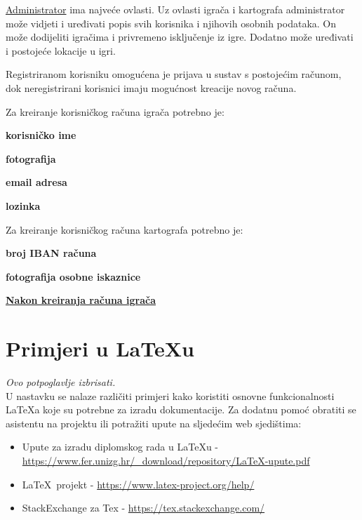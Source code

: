 		\textnormal{\underline{Administrator} ima najveće ovlasti. Uz ovlasti igrača i kartografa administrator može vidjeti i uređivati popis svih korisnika i njihovih osobnih  podataka. On može dodijeliti  igračima i privremeno isključenje iz igre. Dodatno može uređivati i postojeće lokacije u igri.}
		
		\textnormal{Registriranom korisniku omogućena je prijava u sustav s postojećim računom, dok neregistrirani korisnici imaju mogućnost kreacije novog računa.}
		
		\textnormal{Za kreiranje korisničkog računa igrača potrebno je:}
		\begin{packed_item}
			\item \textbf{korisničko ime}
			\item \textbf{fotografija}
			\item \textbf{email adresa}
			\item \textbf{lozinka}
		\end{packed_item}
		
		\textnormal{Za kreiranje korisničkog računa kartografa potrebno je:}
		\begin{packed_item}
			\item \textbf{broj IBAN računa}
			\item \textbf{fotografija osobne iskaznice}
		\end{packed_item}
	
	
	
		\textbf{\underline{Nakon kreiranja računa igrača}}
		
			
		
		
		\eject
		
		\section{Primjeri u \LaTeX u}
		
		\textit{Ovo potpoglavlje izbrisati.}\\

		U nastavku se nalaze različiti primjeri kako koristiti osnovne funkcionalnosti \LaTeX a koje su potrebne za izradu dokumentacije. Za dodatnu pomoć obratiti se asistentu na projektu ili potražiti upute na sljedećim web sjedištima:
		\begin{itemize}
			\item Upute za izradu diplomskog rada u \LaTeX u - \url{https://www.fer.unizg.hr/_download/repository/LaTeX-upute.pdf}
			\item \LaTeX\ projekt - \url{https://www.latex-project.org/help/}
			\item StackExchange za Tex - \url{https://tex.stackexchange.com/}\\
		
		\end{itemize} 	


